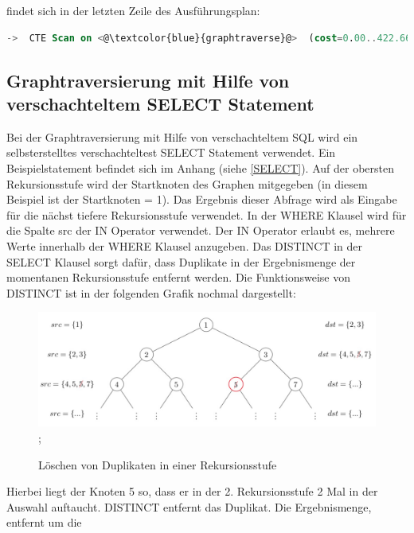 findet sich in der letzten Zeile des Ausführungsplan:
\begin{lstlisting}[language=SQL,caption = Aufruf der graphtraverse Funktion im Ausführungsplan,frame=single, label={functionCallGraphtraverse} ]
    ->  CTE Scan on <@\textcolor{blue}{graphtraverse}@>  (cost=0.00..422.66 rows=21133 width=4) (actual time=0.015..16.921 rows=6056 loops=1)
\end{lstlisting}
\subsection{Graphtraversierung mit Hilfe von verschachteltem SELECT Statement}
Bei der Graphtraversierung mit Hilfe von verschachteltem \ac{SQL} wird ein selbsterstelltes verschachteltest SELECT Statement verwendet. Ein Beispielstatement
befindet sich im Anhang (siehe \ref{SELECT}). Auf der obersten Rekursionsstufe wird der Startknoten des Graphen mitgegeben (in diesem Beispiel ist der Startknoten = 1).
Das Ergebnis dieser Abfrage wird als Eingabe für die nächst tiefere Rekursionsstufe verwendet. In der WHERE Klausel wird für die Spalte src der IN Operator verwendet.
Der IN Operator erlaubt es, mehrere Werte innerhalb der WHERE Klausel anzugeben. Das DISTINCT in der SELECT Klausel sorgt dafür, dass Duplikate in der Ergebnismenge
der momentanen Rekursionsstufe entfernt werden. Die Funktionsweise von DISTINCT ist in der folgenden
Grafik nochmal dargestellt:
\begin{figure}[H]
    \includegraphics[width = \linewidth]{images/Distinct.jpg};
    \caption{Löschen von Duplikaten in einer Rekursionsstufe}
\end{figure}
Hierbei liegt der Knoten 5 so, dass er in der 2. Rekursionsstufe 2 Mal in der Auswahl auftaucht. DISTINCT entfernt das Duplikat. Die Ergebnismenge, entfernt um die
